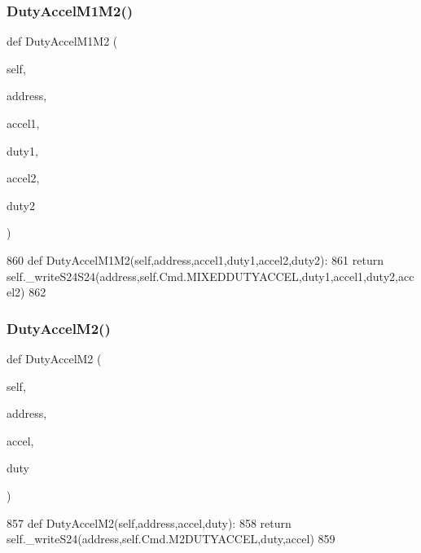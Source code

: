 \subsubsection{\texorpdfstring{Duty\+Accel\+M1\+M2()}{DutyAccelM1M2()}}
{\footnotesize\ttfamily def Duty\+Accel\+M1\+M2 (\begin{DoxyParamCaption}\item[{}]{self,  }\item[{}]{address,  }\item[{}]{accel1,  }\item[{}]{duty1,  }\item[{}]{accel2,  }\item[{}]{duty2 }\end{DoxyParamCaption})}


\begin{DoxyCode}
860     \textcolor{keyword}{def }DutyAccelM1M2(self,address,accel1,duty1,accel2,duty2):
861         \textcolor{keywordflow}{return} self.\_writeS24S24(address,self.Cmd.MIXEDDUTYACCEL,duty1,accel1,duty2,accel2)
862         
\end{DoxyCode}
\mbox{\label{classtoxic__hardware_1_1roboclaw__3_1_1Roboclaw_a881053800292742cd8419a6158fe36ca}} 
\subsubsection{\texorpdfstring{Duty\+Accel\+M2()}{DutyAccelM2()}}
{\footnotesize\ttfamily def Duty\+Accel\+M2 (\begin{DoxyParamCaption}\item[{}]{self,  }\item[{}]{address,  }\item[{}]{accel,  }\item[{}]{duty }\end{DoxyParamCaption})}


\begin{DoxyCode}
857     \textcolor{keyword}{def }DutyAccelM2(self,address,accel,duty):
858         \textcolor{keywordflow}{return} self.\_writeS24(address,self.Cmd.M2DUTYACCEL,duty,accel)
859 
\end{DoxyCode}
\mbox{\label{classtoxic__hardware_1_1roboclaw__3_1_1Roboclaw_afd7c4865f7e4c723f66b5b51ce8069d3}} 
